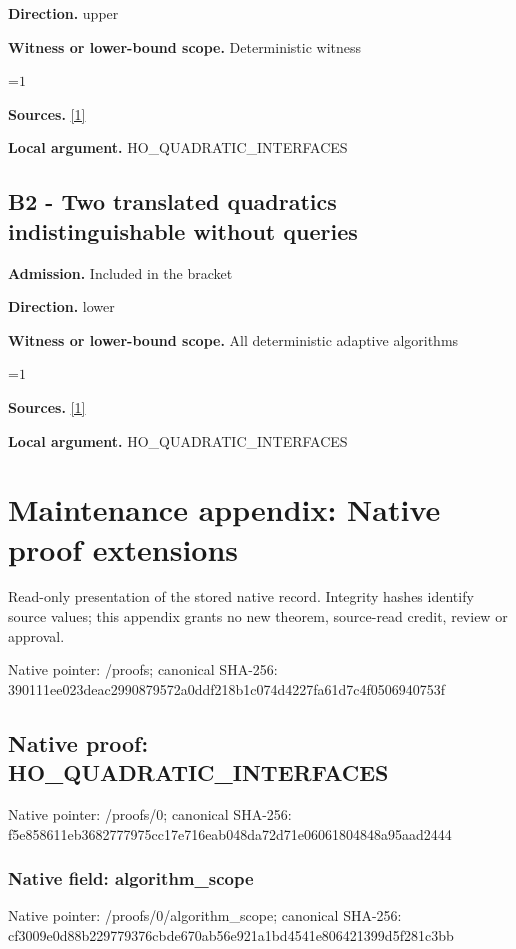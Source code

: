 \documentclass[10pt,a4paper]{article}
\newcommand{\AtlasMath}[1]{\par\begingroup\centering\setbox0=\hbox{$\displaystyle #1$}\ifdim\wd0>1.4\linewidth\typeout{ATLAS WIDE FORMULA: \the\wd0}\fi\ifdim\wd0>\linewidth\resizebox{\linewidth}{!}{\box0}\else\box0\fi\par\endgroup}
\begin{document}
\textbf{Direction.} upper

\textbf{Witness or lower-bound scope.} Deterministic witness

\AtlasMath{1}
\textbf{Sources.} \href{https://nvlpubs.nist.gov/nistpubs/jres/049/jresv49n6p409_a1b.pdf}{[1]}

\textbf{Local argument.} HO\_\allowbreak{}QUADRATIC\_\allowbreak{}INTERFACES

\subsection{B2 - Two translated quadratics indistinguishable without queries}
\textbf{Admission.} Included in the bracket

\textbf{Direction.} lower

\textbf{Witness or lower-bound scope.} All deterministic adaptive algorithms

\AtlasMath{1}
\textbf{Sources.} \href{https://nvlpubs.nist.gov/nistpubs/jres/049/jresv49n6p409_a1b.pdf}{[1]}

\textbf{Local argument.} HO\_\allowbreak{}QUADRATIC\_\allowbreak{}INTERFACES

\section{Maintenance appendix: Native proof extensions}
Read-only presentation of the stored native record. Integrity hashes identify source values; this appendix grants no new theorem, source-read credit, review or approval.

Native pointer: /proofs; canonical SHA-256: 390111ee023deac2990879572a0ddf218b1c074d4227fa61d7c4f0506940753f

\subsection{Native proof: HO\_\allowbreak{}QUADRATIC\_\allowbreak{}INTERFACES}
Native pointer: /proofs/0; canonical SHA-256: f5e858611eb3682777975cc17e716eab048da72d71e06061804848a95aad2444

\subsubsection{Native field: algorithm\_\allowbreak{}scope}
Native pointer: /proofs/0/algorithm\_\allowbreak{}scope; canonical SHA-256: cf3009e0d88b229779376cbde670ab56e921a1bd4541e806421399d5f281c3bb
\end{document}
